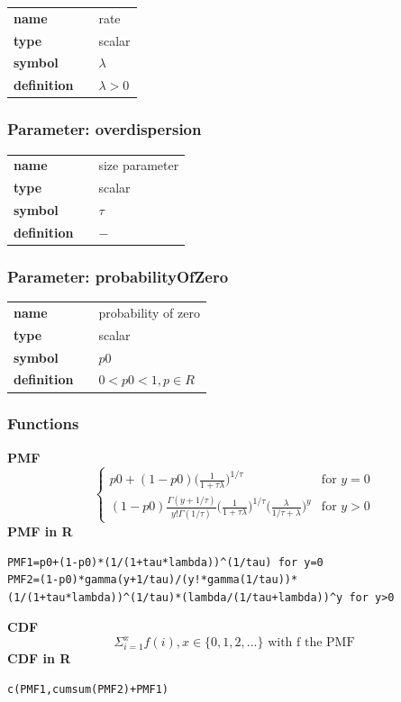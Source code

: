 \noindent\begin{tabular}{p{2cm}cl}
\textbf{name} & & rate \\
\textbf{type} & & scalar \\
\textbf{symbol} & & $\lambda$  \\
\textbf{definition} & & $\lambda > 0$
\end{tabular}
\subsubsection*{Parameter: overdispersion}

\noindent\begin{tabular}{p{2cm}cl}
\textbf{name} & & size parameter \\
\textbf{type} & & scalar \\
\textbf{symbol} & & $\tau$  \\
\textbf{definition} & & $-$
\end{tabular}
\subsubsection*{Parameter: probabilityOfZero}

\noindent\begin{tabular}{p{2cm}cl}
\textbf{name} & & probability of zero \\
\textbf{type} & & scalar \\
\textbf{symbol} & & $p0$  \\
\textbf{definition} & & $0<p0<1, p \in R$
\end{tabular}
\subsubsection*{Functions}

\smallskip \noindent \hspace{.2cm} \textbf{PMF} 
\begin{equation*}
\begin{cases}
p0 + (1-p0) \Big(\frac{1}{1 + \tau\lambda} \Big)^{1/\tau} & \text{for } y = 0 \\ 
(1-p0) \frac{\Gamma(y+1/\tau)}{y!\Gamma(1/\tau)} \Big(\frac{1}{1 + \tau\lambda} \Big)^{1/\tau} 
\Big(\frac{\lambda}{1/\tau + \lambda} \Big)^{y} & \text{for } y > 0
\end{cases}
\end{equation*}
\smallskip \noindent \hspace{.2cm} \textbf{PMF in R}  
\begin{verbatim}
PMF1=p0+(1-p0)*(1/(1+tau*lambda))^(1/tau) for y=0
PMF2=(1-p0)*gamma(y+1/tau)/(y!*gamma(1/tau))*(1/(1+tau*lambda))^(1/tau)*(lambda/(1/tau+lambda))^y for y>0
\end{verbatim}
\smallskip \noindent \hspace{.2cm} \textbf{CDF} 
\begin{equation*}\Sigma_{i=1}^x f(i), x \in \{0,1,2,...\}
\text { with f the PMF}\end{equation*}
\smallskip \noindent \hspace{.2cm} \textbf{CDF in R}  
\begin{verbatim}
c(PMF1,cumsum(PMF2)+PMF1)
\end{verbatim}
\smallskip
